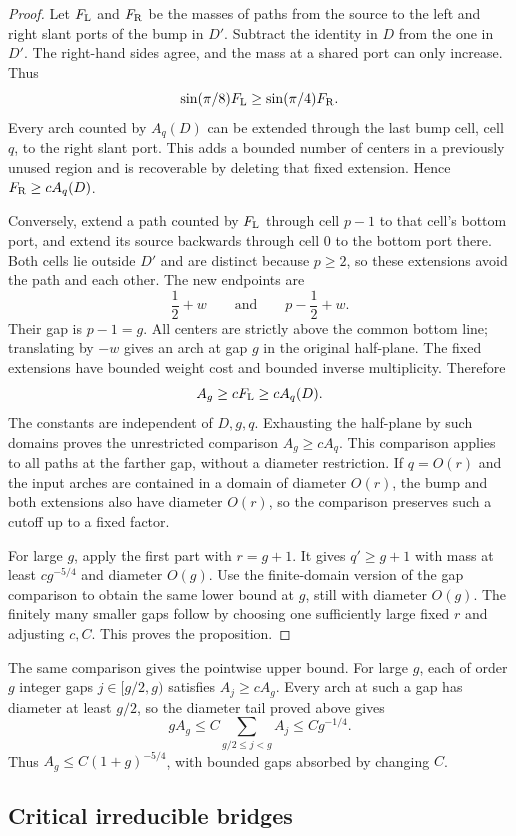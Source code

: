 \documentclass[11pt]{article}
\numberwithin{equation}{section}
\theoremstyle{definition}\newtheorem{definition}[theorem]{Definition}
\theoremstyle{remark}\newtheorem{remark}[theorem]{Remark}
\begin{document}
\begin{proof}
Let $F_{\rm L}$ and $F_{\rm R}$ be the masses of paths from the
source to the left and right slant ports of the bump in $D'$.
Subtract the identity in $D$ from the one in $D'$.  The right-hand
sides agree, and the mass at a shared port can only increase.  Thus
\[
 \sin(\pi/8)F_{\rm L}\ge\sin(\pi/4)F_{\rm R}.
\]
Every arch counted by $A_q(D)$ can be extended through the last bump
cell, cell $q$, to the right slant port.  This adds a bounded number
of centers in a previously unused region and is recoverable by
deleting that fixed extension.  Hence $F_{\rm R}\ge cA_q(D)$.

Conversely, extend a path counted by $F_{\rm L}$ through cell $p-1$
to that cell's bottom port, and extend its source backwards through
cell $0$ to the bottom port there.  Both cells lie outside $D'$ and
are distinct because $p\ge2$, so these extensions avoid the path
and each other.  The new endpoints are
\[
 \frac12+w\qquad\text{and}\qquad p-\frac12+w.
\]
Their gap is $p-1=g$.  All centers are strictly above the common
bottom line; translating by $-w$ gives an arch at gap $g$ in the
original half-plane.  The fixed extensions have bounded weight cost
and bounded inverse multiplicity.  Therefore
\[
 A_g\ge cF_{\rm L}\ge cA_q(D).
\]
The constants are independent of $D,g,q$.  Exhausting the half-plane
by such domains proves the unrestricted comparison $A_g\ge cA_q$.
This comparison applies to all paths at the farther gap, without a
diameter restriction.  If $q=O(r)$ and the input arches are contained
in a domain of diameter $O(r)$, the bump and both extensions also
have diameter $O(r)$, so the comparison preserves such a cutoff up
to a fixed factor.

For large $g$, apply the first part with $r=g+1$.  It gives
$q'\ge g+1$ with mass at least $cg^{-5/4}$ and diameter $O(g)$.
Use the finite-domain version of the gap comparison to obtain the
same lower bound at $g$, still with diameter $O(g)$.  The finitely
many smaller gaps follow by choosing one sufficiently large fixed
$r$ and adjusting $c,C$.  This proves the proposition.
\end{proof}

The same comparison gives the pointwise upper bound. For large $g$,
each of order $g$ integer gaps $j\in[g/2,g)$ satisfies $A_j\ge cA_g$.
Every arch at such a gap has diameter at least $g/2$, so the diameter
tail proved above gives
\[
 gA_g\le C\sum_{g/2\le j<g}A_j\le Cg^{-1/4}.
\]
Thus $A_g\le C(1+g)^{-5/4}$, with bounded gaps absorbed by changing $C$.

\subsection{Critical irreducible bridges}\label{L:step17}
\end{document}
